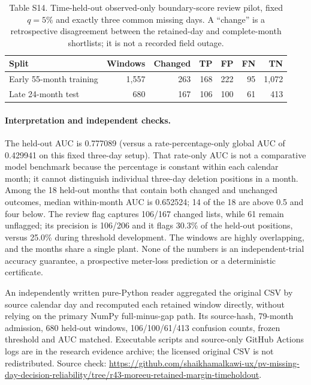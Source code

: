 \documentclass[11pt]{article}
\begin{document}
\begin{table}[htbp]
\centering
\caption*{Table S14. Time-held-out observed-only boundary-score review pilot, fixed $q=5\%$ and exactly three common missing days. A ``change'' is a retrospective disagreement between the retained-day and complete-month shortlists; it is not a recorded field outage.}
\footnotesize
\begin{tabular}{lrrrrrr}
\toprule
Split & Windows & Changed & TP & FP & FN & TN \\
\midrule
Early 55-month training & 1,557 & 263 & 168 & 222 & 95 & 1,072 \\
Late 24-month test & 680 & 167 & 106 & 100 & 61 & 413 \\
\bottomrule
\end{tabular}
\end{table}

\paragraph{Interpretation and independent checks.} The held-out AUC is 0.777089 (versus a rate-percentage-only global AUC of 0.429941 on this fixed three-day setup). That rate-only AUC is not a comparative model benchmark because the percentage is constant within each calendar month; it cannot distinguish individual three-day deletion positions in a month. Among the 18 held-out months that contain both changed and unchanged outcomes, median within-month AUC is 0.652524; 14 of the 18 are above 0.5 and four below. The review flag captures 106/167 changed lists, while 61 remain unflagged; its precision is 106/206 and it flags 30.3\% of the held-out positions, versus 25.0\% during threshold development. The windows are highly overlapping, and the months share a single plant. None of the numbers is an independent-trial accuracy guarantee, a prospective meter-loss prediction or a deterministic certificate.

An independently written pure-Python reader aggregated the original CSV by source calendar day and recomputed each retained window directly, without relying on the primary NumPy full-minus-gap path. Its source-hash, 79-month admission, 680 held-out windows, 106/100/61/413 confusion counts, frozen threshold and AUC matched. Executable scripts and source-only GitHub Actions logs are in the research evidence archive; the licensed original CSV is not redistributed. Source check: \url{https://github.com/shaikhamalkawi-ux/pv-missing-day-decision-reliability/tree/r43-moreeu-retained-margin-timeholdout}.
\end{document}
